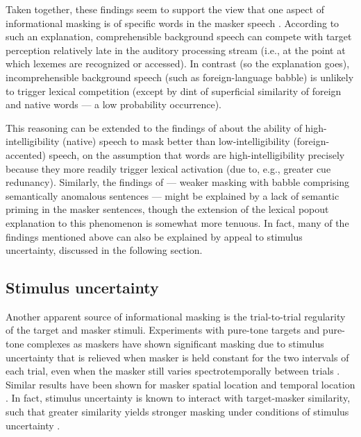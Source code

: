 Taken together, these findings seem to support the view that one aspect of informational masking is  of specific words in the masker speech \citep{HoenEtAl2007,BoulengerEtAl2010}.  According to such an explanation, comprehensible background speech can compete with target perception relatively late in the auditory processing stream (i.e., at the point at which lexemes are recognized or accessed).  In contrast (so the explanation goes), incomprehensible background speech (such as foreign-language babble) is unlikely to trigger lexical competition (except by dint of superficial similarity of foreign and native words — a low probability occurrence).

This reasoning can be extended to the findings of \citeauthor{CalandruccioEtAl2010} about the ability of high-intelligibility (native) speech to mask better than low-intelligibility (foreign-accented) speech, on the assumption that words are high-intelligibility precisely because they more readily trigger lexical activation (due to, e.g., greater cue redunancy).  Similarly, the findings of \citet{BrouwerEtAl2012} — weaker masking with babble comprising semantically anomalous sentences — might be explained by a lack of semantic priming in the masker sentences, though the extension of the lexical popout explanation to this phenomenon is somewhat more tenuous.  In fact, many of the findings mentioned above can also be explained by appeal to stimulus uncertainty, discussed in the following section. %

\subsection{Stimulus uncertainty}
Another apparent source of informational masking is the trial-to-trial regularity of the target and masker stimuli.  Experiments with pure-tone targets and pure-tone complexes as maskers have shown significant masking due to stimulus uncertainty that is relieved when masker is held constant for the two intervals of each trial, even when the masker still varies spectrotemporally between trials \citep{NeffGreen1987, NeffCallahan1988}.  Similar results have been shown for masker spatial location \citep{FanEtAl2008} and temporal location \citep{BoninoLeibold2008}.  
In fact, stimulus uncertainty is known to interact with target-masker similarity, such that greater similarity yields stronger masking under conditions of stimulus uncertainty \citep{DurlachEtAl2003b}.  %

